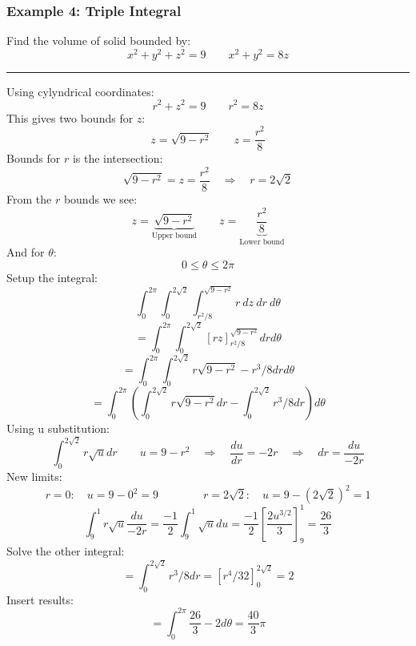 \subsubsection{Example 4: Triple Integral}
Find the volume of solid bounded by:
$$x^2+y^2+z^2=9\qquad x^2+y^2=8z$$

\rule{\textwidth}{0.5pt}

Using cylyndrical coordinates:
$$r^2+z^2=9\qquad r^2=8z$$
This gives two bounds for $z$:
$$z=\sqrt{9-r^2}\qquad z=\frac{r^2}{8}$$
Bounds for $r$ is the intersection:
$$\sqrt{9-r^2}= z=\frac{r^2}{8}\quad\Rightarrow\quad r=2\sqrt{2}$$
From the $r$ bounds we see:
$$z=\underbrace{\sqrt{9-r^2}}_\text{Upper bound}\qquad z=\underbrace{\frac{r^2}{8}}_\text{Lower bound}$$
And for $\theta$:
$$0\leq\theta\leq 2\pi$$
Setup the integral:
$$\int_{0}^{2\pi}\int_{0}^{2\sqrt{2}}\int_{r^2/8}^{\sqrt{9-r^2}}r\ dz\ dr\ d\theta$$
$$=\int_{0}^{2\pi}\int_{0}^{2\sqrt{2}}\left[rz \right]_{r^2/8}^{\sqrt{9-r^2}} dr d\theta$$
$$=\int_{0}^{2\pi}\int_{0}^{2\sqrt{2}}r\sqrt{9-r^2}- r^3/8 dr d\theta$$
$$=\int_{0}^{2\pi}\left(\int_{0}^{2\sqrt{2}}r\sqrt{9-r^2}dr-\int_{0}^{2\sqrt{2}}r^3/8 dr \right)d\theta$$
Using u substitution:
$$\int_{0}^{2\sqrt{2}}r\sqrt{u}dr\qquad u=9-r^2\quad\Rightarrow\quad \frac{du}{dr}=-2r\quad\Rightarrow\quad dr=\frac{du}{-2r}$$
New limits:
$$r=0:\quad u=9-0^2=9\qquad\qquad r=2\sqrt{2}:\quad u=9-(2\sqrt{2})^2=1$$
$$\int_{9}^{1}r\sqrt{u}\frac{du}{-2r}=\frac{-1}{2}\int_{9}^{1}\sqrt{u}du=\frac{-1}{2}\left[\frac{2 u^{3/2}}{3}\right]_{9}^{1}=\frac{26}{3}$$
Solve the other integral:
$$=\int_{0}^{2\sqrt{2}}r^3/8 dr=\left[r^4/32 \right]_{0}^{2\sqrt{2}}=2$$
Insert results:
$$=\int_{0}^{2\pi}\frac{26}{3}-2d\theta=\boxed{\frac{40}{3}\pi}$$
